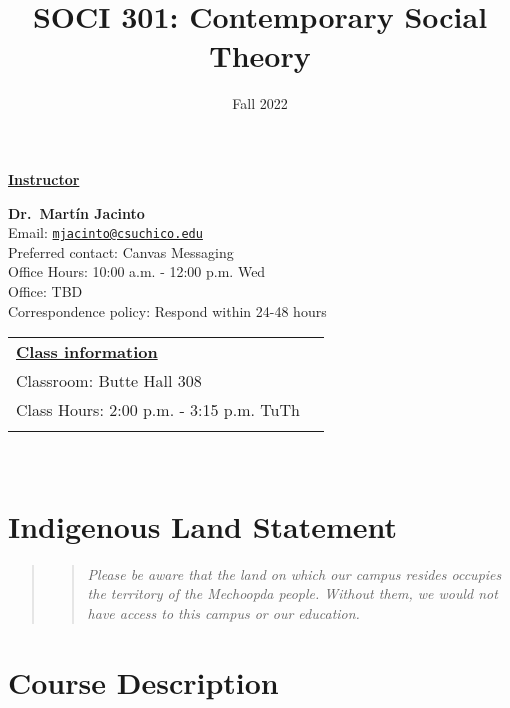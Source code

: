 \documentclass[11pt,]{article}
\title{SOCI 301: Contemporary Social Theory}
\date{Fall 2022}
\begin{document}
  

		\maketitle
		
	
		\thispagestyle{firststyle}

\textbf{\underline{Instructor}}
\begin{multicols}{2}

  \textbf{Dr.~Martín Jacinto}\\
  Email: \href{mailto:mjacinto@csuchico.edu}{\nolinkurl{mjacinto@csuchico.edu}}\\
  Preferred contact: Canvas Messaging\\
  Office Hours: 10:00 a.m. - 12:00 p.m. Wed\\
  Office: TBD\\
  Correspondence policy: Respond within 24-48 hours\\
    \columnbreak
    
  \end{multicols}
	
\noindent \begin{tabular*}{\textwidth}{ @{\extracolsep{\fill}} lr @{\extracolsep{\fill}}}
\textbf{\underline{Class information}}\\
  Classroom: Butte Hall 308\\
  Class Hours: 2:00 p.m. - 3:15 p.m. TuTh\\
    \\
	\end{tabular*}\\


\vspace{2mm}


\hypertarget{indigenous-land-statement}{%
\section{Indigenous Land Statement}\label{indigenous-land-statement}}

\begin{quote}
\begin{quote}
\emph{Please be aware that the land on which our campus resides occupies
the territory of the Mechoopda people. Without them, we would not have
access to this campus or our education.}
\end{quote}
\end{quote}

\hypertarget{course-description}{%
\section{Course Description}\label{course-description}}
\end{document}
